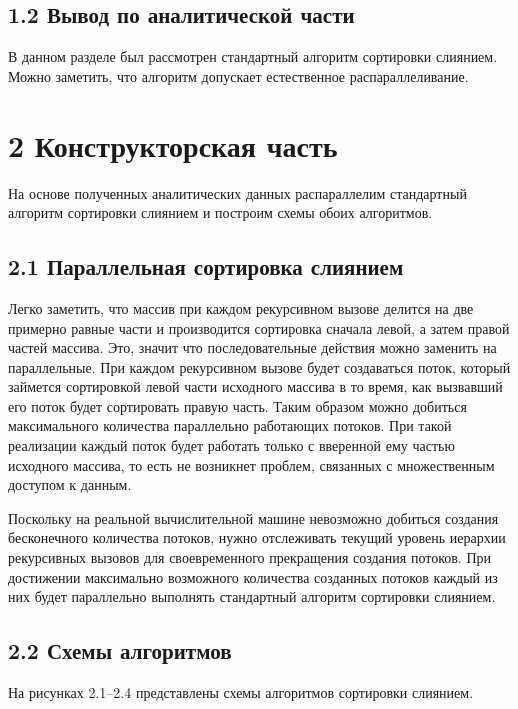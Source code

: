 \documentclass[12pt, a4paper]{report}
\begin{document}
\section*{1.2 Вывод по аналитической части}
В данном разделе был рассмотрен стандартный алгоритм сортировки слиянием. Можно заметить, что алгоритм допускает естественное распараллеливание.\newline

\newpage
\chapter*{2 Конструкторская часть}

На основе полученных аналитических данных распараллелим стандартный алгоритм сортировки слиянием и построим схемы обоих алгоритмов.

\section*{2.1 Параллельная сортировка слиянием}

Легко заметить, что массив при каждом рекурсивном вызове делится на две примерно равные части и производится сортировка сначала левой, а затем правой частей массива. Это, значит что последовательные действия можно заменить на параллельные. При каждом рекурсивном вызове будет создаваться поток, который займется сортировкой левой части исходного массива в то время, как вызвавший его поток будет сортировать правую часть. Таким образом можно добиться максимального количества параллельно работающих потоков. При такой реализации каждый поток будет работать только с вверенной ему частью исходного массива, то есть не возникнет проблем, связанных с множественным доступом к данным.

Поскольку на реальной вычислительной машине невозможно добиться создания бесконечного количества потоков, нужно отслеживать текущий уровень иерархии рекурсивных вызовов для своевременного прекращения создания потоков. При достижении максимально возможного количества созданных потоков каждый из них будет параллельно выполнять стандартный алгоритм сортировки слиянием.

\section*{2.2 Схемы алгоритмов}
На рисунках 2.1--2.4 представлены схемы алгоритмов сортировки слиянием.
\end{document}
